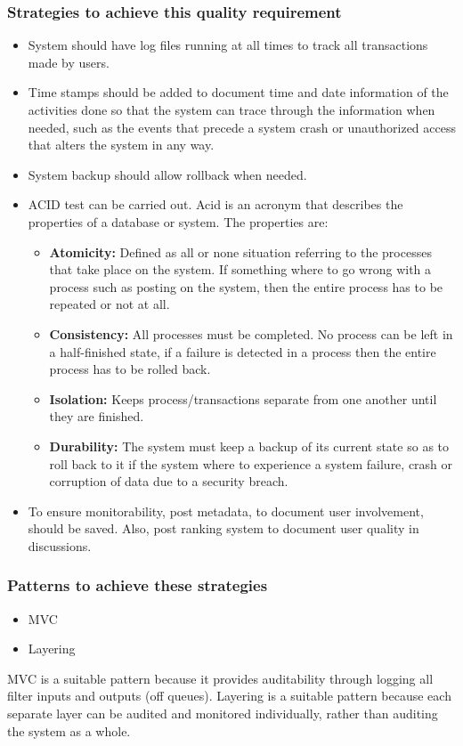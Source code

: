 \documentclass[a4paper,12pt]{report}
\begin{document}
 \subsubsection{Strategies to achieve this quality requirement}
 \begin{itemize}
 \item System should have log files running at all times to track all transactions made by users. 
 \item Time stamps should be added to document time and date information of the activities done so that the system can trace through the
information when needed, such as the events that precede a system crash or unauthorized access
that alters the system in any way.
\item System backup should allow rollback when needed.
\item ACID test can be carried out. Acid is an acronym that describes the properties of a database or system. The properties are:
	\begin{itemize}
	\item \textbf{Atomicity:} Defined as all or none situation referring to the processes that take place on the 
	   system. If something where to go wrong with a process such as posting on the system,
	   then the entire process has to be repeated or not at all.
	\item \textbf{Consistency:} All processes must be completed. No process can be left in a half-finished state,
	     if a failure is detected in a process then the entire process has to be rolled back.
	\item \textbf{Isolation:} Keeps process/transactions separate from one another until they are finished.
	\item \textbf{Durability:} The system must keep a backup of its current state so as to roll back to it if
	    the system where to experience a system failure, crash or corruption of data due
	    to a security breach.
	\end{itemize}
\item To ensure monitorability, post metadata, to document user involvement, should be saved. Also, post ranking system to document user quality in discussions.
 \end{itemize}
 \subsubsection{Patterns to achieve these strategies}
 \begin{itemize}
 \item MVC
 \item Layering
\end{itemize} 
 MVC is a suitable pattern because it provides auditability through logging all filter inputs and outputs (off queues). Layering is a suitable pattern because each separate layer can be audited and monitored individually, rather than auditing the system as a whole.
\end{document}
